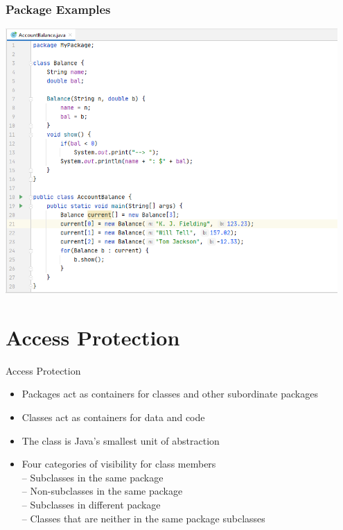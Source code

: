 \documentclass{beamer}
\begin{document}
\begin{frame}
\frametitle{Package Examples}

\includegraphics[width=0.95\textwidth]{MyPackage.png}
\end{frame}


\section{Access Protection}

\begin{frame}{Access Protection}
\begin{itemize}
\item Packages act as containers for classes and other
subordinate packages

\item Classes act as containers for data and code
\item The class is Java’s smallest unit of abstraction
\item Four categories of visibility for class members\\
– Subclasses in the same package\\
– Non-subclasses in the same package\\
– Subclasses in different package\\
– Classes that are neither in the same package
subclasses\\
\end{itemize}
\end{frame}
\end{document}

